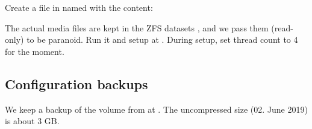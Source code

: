 \documentclass[a4paper,10pt,english]{sphinxmanual}
\begin{document}
Create a file in  named  with the
content:

\begin{sphinxVerbatim}[commandchars=\\\{\}]
   \PYGZbs{}
  \PYGZbs{}
  \PYGZbs{}
  \PYGZbs{}
  \PYGZbs{}
  \PYGZbs{}
  \PYGZbs{}
  \PYGZbs{}
  \PYGZbs{}
  \PYGZbs{}
\end{sphinxVerbatim}

The actual media files are kept in the ZFS datasets , and we pass
them  (read-only) to be paranoid. Run it and setup at
 . During setup, set thread count to 4 for the moment.


\subsection{Configuration backups}
\label{\detokenize{containers:configuration-backups}}
We keep a backup of the  volume from
 at . The
uncompressed size (02. June 2019) is about 3 GB.
\end{document}
